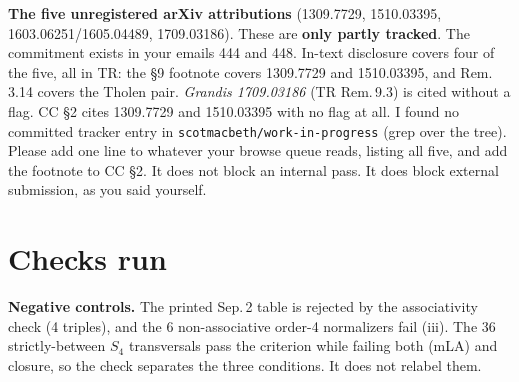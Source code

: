 \documentclass[11pt]{article}
\begin{document}
\textbf{The five unregistered arXiv attributions} (1309.7729, 1510.03395, 1603.06251/1605.04489,
1709.03186). These are \textbf{only partly tracked}. The commitment exists in your emails 444 and 448. In-text disclosure covers
four of the five, all in TR: the \S9 footnote covers 1309.7729 and 1510.03395, and Rem.\,3.14 covers the Tholen pair. \emph{Grandis
1709.03186} (TR Rem.\,9.3) is cited without a flag. CC \S2 cites 1309.7729 and 1510.03395 with no
flag at all. I found no committed tracker entry in \texttt{scotmacbeth/work-in-progress} (grep over the tree).
Please add one line to whatever your browse queue reads, listing all five, and add the footnote to CC
\S2. It does not block an internal pass. It does block external submission, as you said yourself.

\section*{Checks run}
{\small
{}}

\textbf{Negative controls.} The printed Sep.\,2 table is rejected by the associativity check (4 triples), and
the 6 non-associative order-4 normalizers fail (iii). The 36 strictly-between $S_4$ transversals pass the
criterion while failing both (mLA) and closure, so the check separates the three conditions. It does not
relabel them.
\end{document}
